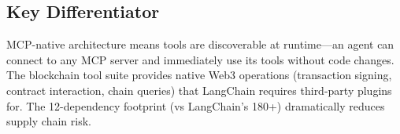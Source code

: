 \subsection{Key Differentiator}

MCP-native architecture means tools are discoverable at runtime---an agent can connect to any MCP server and immediately use its tools without code changes. The blockchain tool suite provides native Web3 operations (transaction signing, contract interaction, chain queries) that LangChain requires third-party plugins for. The 12-dependency footprint (vs LangChain's 180+) dramatically reduces supply chain risk.

